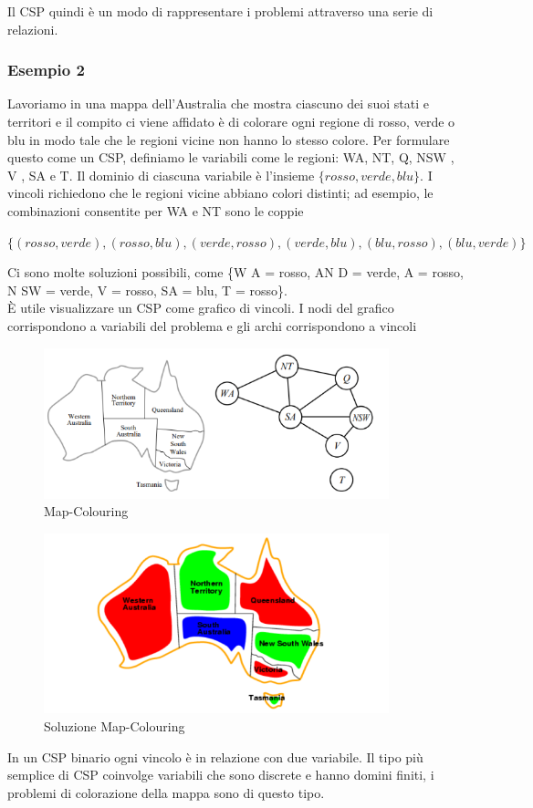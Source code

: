 Il CSP quindi è un modo di rappresentare i problemi attraverso una serie di relazioni.
\subsubsection{Esempio 2}
Lavoriamo in una mappa dell’Australia che mostra ciascuno dei suoi stati e territori e il compito ci viene affidato è di colorare ogni regione di rosso, verde o blu in modo tale che le regioni vicine non hanno lo stesso colore. Per formulare questo come un CSP, definiamo le variabili come le regioni: WA, NT, Q, NSW , V , SA e T. Il dominio di ciascuna variabile è l’insieme $\{rosso, verde, blu\}$. I vincoli richiedono che le regioni vicine abbiano colori distinti; ad esempio, le combinazioni consentite per WA e NT sono le coppie
\begin{center}
    $\{(rosso, verde), (rosso, blu), (verde, rosso), (verde, blu), (blu, rosso), (blu, verde)\}$ 
\end{center}
Ci sono molte soluzioni possibili, come \{W A = rosso, AN D = verde, A = rosso, N SW = verde, V = rosso, SA = blu, T = rosso\}. 
\\È utile visualizzare un CSP come grafico di vincoli. I nodi del grafico corrispondono a variabili del problema e gli archi corrispondono a vincoli
\begin{figure}[htp]
	\centering
    \includegraphics[width=10cm, keepaspectratio]{img/Cap1/map-coloring1.png}
    \caption{Map-Colouring}
\end{figure}
\newpage
\begin{figure}[htp]
	\centering
    \includegraphics[width=10cm, keepaspectratio]{img/Cap1/map-coloring2.png}
    \caption{Soluzione Map-Colouring}
\end{figure}
In un CSP binario ogni vincolo è in relazione con due variabile. Il tipo più semplice di CSP coinvolge variabili che sono discrete e hanno domini finiti, i problemi di colorazione della mappa sono di questo tipo.
